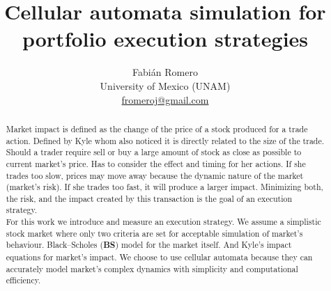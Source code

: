 \documentclass[twoside]{article}
\title{\vspace{-15mm}\fontsize{24pt}{10pt}\selectfont\textbf{Cellular automata simulation for portfolio execution strategies}} %
\author{
\large Fabián Romero \\ %
\normalsize University of Mexico (UNAM) \\ %
\normalsize \href{mailto:fromeroj@gmail.com}{fromeroj@gmail.com} %
\vspace{-5mm}
}
\date{}
\begin{document}
\maketitle %

\thispagestyle{fancy} %


\begin{abstract}

\noindent 
Market impact is defined as the change of the price of a stock produced for a trade action. Defined by Kyle \cite{Kyle1985} whom also noticed it is directly related to the size of the trade. \\
Should a trader require sell or buy a large amount of stock as close as possible to current market's price. Has to consider the effect and timing for her actions.
If she trades too slow, prices may move away because the dynamic nature of the market (market's risk). If she trades too fast, it will produce a larger impact. Minimizing both, the risk, and the impact created by this transaction is the goal of an execution strategy.\\
For this work we introduce and measure an execution strategy. 
We assume a simplistic stock market where only two criteria are set for acceptable simulation of market's behaviour.
Black–Scholes ({\bf BS}) \cite{black1973poa} model for the market itself.
And Kyle's impact equations for market's impact. We choose to use cellular automata because they can accurately model market's complex dynamics with simplicity and computational efficiency.
\end{abstract}

\end{document}

